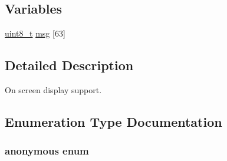 \subsection*{Variables}
\begin{DoxyCompactItemize}
\item 
\hyperlink{stdint_8h_aba7bc1797add20fe3efdf37ced1182c5}{uint8\-\_\-t} \hyperlink{group___o_s_d_module_ga31fe24ba18a63ea1e8cdb622e7ece509}{msg} \mbox{[}63\mbox{]}
\end{DoxyCompactItemize}


\subsection{Detailed Description}
On screen display support. 

\subsection{Enumeration Type Documentation}
\hypertarget{group___o_s_d_module_gadc29c2ff13d900c2f185ee95427fb06c}{\subsubsection[{anonymous enum}]{\setlength{\rightskip}{0pt plus 5cm}anonymous enum}}\label{group___o_s_d_module_gadc29c2ff13d900c2f185ee95427fb06c}
